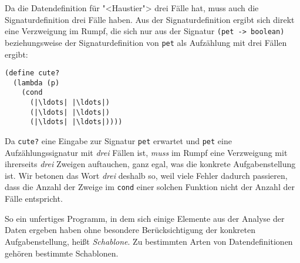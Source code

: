 Da die Datendefinition für "<Haustier"> drei Fälle hat, muss auch die
Signaturdefinition drei Fälle haben.  Aus der Signaturdefinition
ergibt sich direkt eine Verzweigung im Rumpf, die sich nur aus der
Signatur \lstinline{(pet -> boolean)} beziehungsweise der
Signaturdefinition von \lstinline{pet} als Aufzählung mit drei Fällen
ergibt:
%
\begin{lstlisting}
(define cute?
  (lambda (p)
    (cond
      (|\ldots| |\ldots|)
      (|\ldots| |\ldots|)
      (|\ldots| |\ldots|))))
\end{lstlisting}
%
Da \lstinline{cute?} eine Eingabe zur Signatur \lstinline{pet} erwartet und
\lstinline{pet} eine Aufzählungssignatur mit \emph{drei} Fällen ist, \emph{muss}
im Rumpf eine Verzweigung mit ihrerseits \emph{drei} Zweigen
auftauchen, ganz egal, was die konkrete Aufgabenstellung ist.  Wir
betonen das Wort \emph{drei} deshalb so, weil viele Fehler dadurch
passieren, dass die Anzahl der Zweige im \lstinline{cond} einer solchen
Funktion nicht der Anzahl der Fälle entspricht.

So ein unfertiges Programm, in dem sich einige Elemente aus der
Analyse der Daten ergeben haben ohne besondere Berücksichtigung der
konkreten Aufgabenstellung, heißt \textit{Schablone}.  Zu bestimmten
Arten von Datendefinitionen gehören bestimmte Schablonen.

